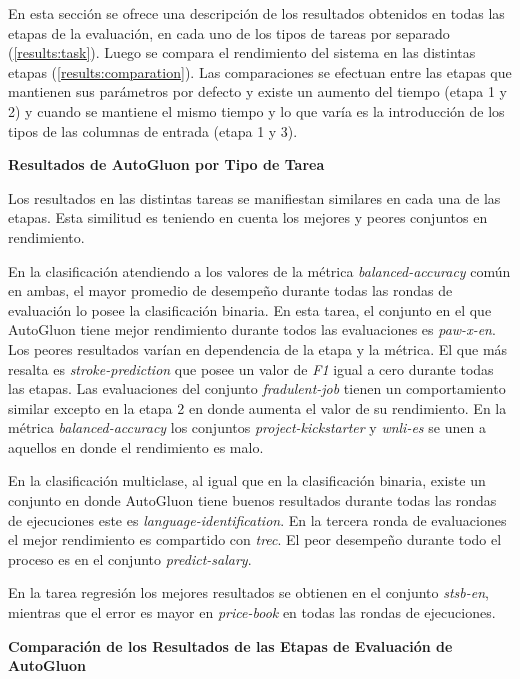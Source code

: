En esta sección se ofrece una descripción de los resultados obtenidos en todas las etapas de la evaluación, en cada uno de los tipos de tareas por 
separado (\ref{results:task}). 
Luego se compara el rendimiento del sistema en las distintas etapas (\ref{results:comparation}). Las comparaciones se efectuan entre las etapas que 
mantienen sus parámetros por defecto y existe un aumento del tiempo (etapa 1 y 2) y cuando se mantiene el mismo tiempo y lo que varía es la introducción de los 
tipos de las columnas de entrada (etapa 1 y 3).


\begin{flushleft} 
  {\large { \textbf{Resultados de AutoGluon por Tipo de Tarea}}}\label{results:task}
\end{flushleft}

Los resultados en las distintas tareas se manifiestan similares en cada una de las etapas. Esta similitud es teniendo en cuenta los mejores y peores conjuntos en 
rendimiento.

En la clasificación atendiendo a los valores de la métrica \textit{balanced-accuracy} común en ambas, el mayor promedio de desempeño durante todas las rondas de 
evaluación lo posee la clasificación binaria.
En esta tarea, el conjunto en el que AutoGluon tiene mejor rendimiento durante todos las evaluaciones es \textit{paw-x-en}. Los peores resultados varían en dependencia de la etapa y la 
métrica. El que más resalta es \textit{stroke-prediction} que posee un valor de \textit{F1} igual a cero durante todas las etapas. Las evaluaciones del conjunto 
\textit{fradulent-job} tienen un comportamiento similar excepto en la etapa 2 en donde aumenta el valor de su rendimiento. En la métrica \textit{balanced-accuracy} 
los conjuntos \textit{project-kickstarter} y \textit{wnli-es} se unen a aquellos en donde el rendimiento es malo.

En la clasificación multiclase, al igual que en la clasificación binaria, existe un conjunto en donde AutoGluon tiene buenos resultados durante todas las rondas de 
ejecuciones este es \textit{language-identification}. En la tercera ronda de evaluaciones el mejor rendimiento es compartido con \textit{trec}. El peor desempeño 
durante todo el proceso es en el conjunto \textit{predict-salary}.

En la tarea regresión los mejores resultados se obtienen en el conjunto \textit{stsb-en}, mientras que el error es mayor en \textit{price-book} en todas las rondas 
de ejecuciones.


\begin{flushleft} 
  {\large { \textbf{Comparación de los Resultados de las Etapas de Evaluación de AutoGluon}}}\label{results:comparation}
\end{flushleft}

